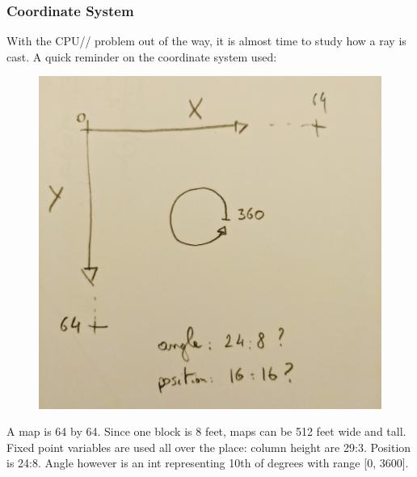 \subsubsection{Coordinate System}
With the CPU// problem out of the way, it is almost time to study how a ray is cast. A quick reminder on the coordinate system used:
\begin{figure}[H]
  \centering
 \includegraphics[width=\textwidth]{imgs/drawings/coordinate_system.png}
\end{figure}
\par
A map is 64 by 64. Since one block is 8 feet, maps can be 512 feet wide and tall. Fixed point variables are used all over the place: column height are 29:3. Position is 24:8. Angle however is an int representing 10th of degrees with range [0, 3600].

















